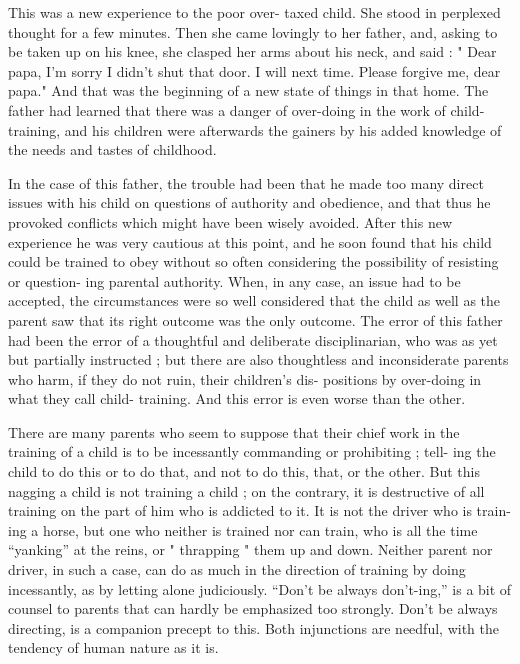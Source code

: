 \documentclass[
]{book}
\begin{document}
This was a new experience to the poor over- taxed child. She stood in perplexed thought for a few minutes. Then she came lovingly to her father, and, asking to be taken up on his knee, she clasped her arms about his neck, and said : " Dear papa, I'm sorry I didn't shut that door. I will next time. Please forgive me, dear papa." And that was the beginning of a new state of things in that home. The father had learned that there was a danger of over-doing in the work of child-training, and his children were afterwards the gainers by his added knowledge of the needs and tastes of childhood.

In the case of this father, the trouble had been that he made too many direct issues with his child on questions of authority and obedience, and that thus he provoked conflicts which might have been wisely avoided. After this new experience he was very cautious at this point, and he soon found that his child could be trained to obey without so often considering the possibility of resisting or question- ing parental authority. When, in any case, an issue had to be accepted, the circumstances were so well considered that the child as well as the parent saw that its right outcome was the only outcome. The error of this father had been the error of a thoughtful and deliberate disciplinarian, who was as yet but partially instructed ; but there are also thoughtless and inconsiderate parents who harm, if they do not ruin, their children's dis- positions by over-doing in what they call child- training. And this error is even worse than the other.

There are many parents who seem to suppose that their chief work in the training of a child is to be incessantly commanding or prohibiting ; tell- ing the child to do this or to do that, and not to do this, that, or the other. But this nagging a child is not training a child ; on the contrary, it is destructive of all training on the part of him who is addicted to it. It is not the driver who is train- ing a horse, but one who neither is trained nor can train, who is all the time ``yanking'' at the reins, or " thrapping " them up and down. Neither parent nor driver, in such a case, can do as much in the direction of training by doing incessantly, as by letting alone judiciously. ``Don't be always don't-ing,'' is a bit of counsel to parents that can hardly be emphasized too strongly. Don't be always directing, is a companion precept to this. Both injunctions are needful, with the tendency of human nature as it is.
\end{document}
